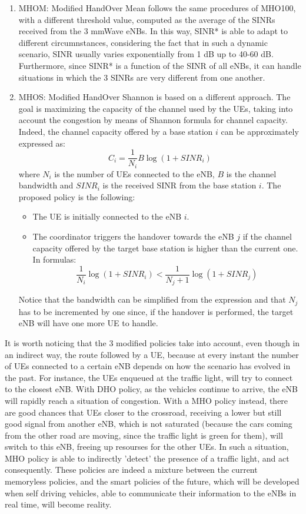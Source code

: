 \documentclass[conference,10pt]{IEEEtran}
\begin{document}
\begin{enumerate}
\item MHOM:
Modified HandOver Mean follows the same procedures of MHO100, with a different threshold value, computed as the average of the SINRs received from the 3 mmWave eNBs. In this way, SINR* is able to adapt to different circumnstances, considering the fact that in such a dynamic scenario, SINR usually varies exponentially from 1 dB up to 40-60 dB. Furthermore, since SINR* is a function of the SINR of all eNBs, it can handle situations in which the 3 SINRs are very different from one another.



\item MHOS:
Modified HandOver Shannon is based on a different approach. The goal is maximizing the capacity of the channel used by the UEs, taking into account the congestion by means of Shannon formula for channel capacity. Indeed, the channel capacity offered by a base station $i$ can be approximately expressed as:
 $$
 C_i=\frac{1}{N_i} B \log(1+SINR_i)
 $$
\noindent where $N_i$ is the number of UEs connected to the eNB, $B$ is the channel bandwidth and $SINR_i$ is the received SINR from the base station $i$.
The proposed policy is the following:

\begin{itemize}
	\item The UE is initially connected to the eNB $i$.
	\item The coordinator triggers the handover towards the eNB $j$ if the channel capacity offered by the target base station is higher than the current one. In formulas:
	$$
	\frac{1}{N_i} \log(1+SINR_i) < \frac{1}{N_j+1} \log(1+SINR_j)
	$$ 
\end{itemize}
\noindent Notice that the bandwidth can be simplified from the expression and that $N_j$ has to be incremented by one since, if the handover is performed, the target eNB will have one more UE to handle.
\end{enumerate}

It is worth noticing that the 3 modified policies take into account, even though in an indirect way, the route followed by a UE, because at every instant the number of UEs connected to a certain eNB depends on how the scenario has evolved in the past. For instance, the UEs enqueued at the traffic light, will try to connect to the closest eNB. With DHO policy, as the vehicles continue to arrive, the eNB will rapidly reach a situation of congestion. With a MHO policy instead, there are good chances that UEs closer to the crossroad, receiving a lower but still good signal from another eNB, which is not saturated (because the cars coming from the other road are moving, since the traffic light is green for them), will switch to this eNB, freeing up resourses for the other UEs. In such a situation, MHO policy is able to indirectly 'detect' the presence of a traffic light, and act consequently. These policies are indeed a mixture between the current memoryless policies, and the smart policies of the future, which will be developed when self driving vehicles, able to communicate their information to the eNBs in real time, will become reality.
\end{document}
